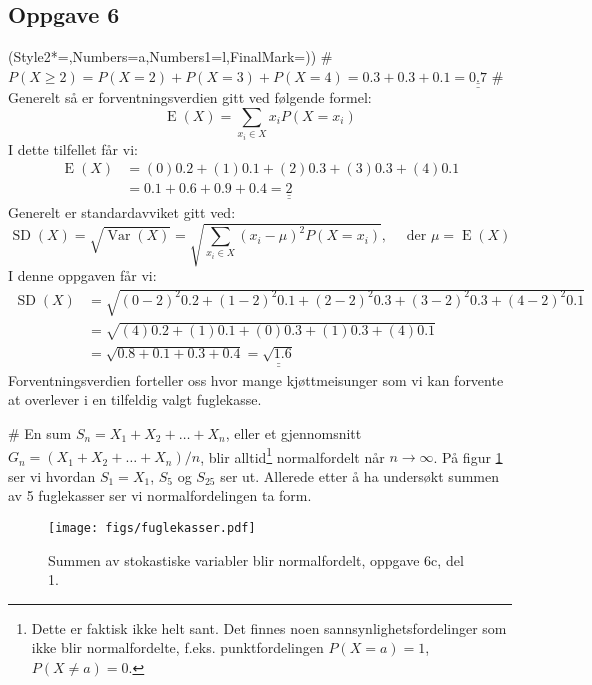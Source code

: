 \documentclass[12pt, a4paper]
{article}						%
\def\answer#1{\underline{\underline{#1}}}
\begin{document}
\subsection*{Oppgave 6}
\begin{easylist}[enumerate]
	\ListProperties(Style2*=,Numbers=a,Numbers1=l,FinalMark={)})
	# $P(X \geq 2) = P(X = 2) + P(X = 3) + P(X = 4) = 0.3 + 0.3 + 0.1 = \answer{0.7}$
	# Generelt så er forventningsverdien gitt ved følgende formel:
	\begin{equation*}
		\operatorname{E}(X) = \sum_{x_i \in X} x_i P(X = x_i) 
	\end{equation*}
	I dette tilfellet får vi:
	\begin{align*}
		\operatorname{E}(X) &= (0) 0.2 + (1) 0.1 + (2) 0.3 + (3) 0.3 + (4) 0.1 \\
		&= 0.1 + 0.6 + 0.9 + 0.4 = \answer{2}
	\end{align*}
	Generelt er standardavviket gitt ved:
	\begin{equation*}
		\operatorname{SD}(X) = \sqrt{\operatorname{Var}(X)} = \sqrt{ \sum_{x_i \in X} \left( x_i - \mu\right)^2  P(X = x_i)}, \quad \text{ der } \mu = \operatorname{E}(X)
	\end{equation*}
	I denne oppgaven får vi:
	\begin{align*}
		\operatorname{SD}(X) &= \sqrt{(0-2)^2 0.2 + (1-2)^2 0.1 + (2-2)^2 0.3 + (3-2)^2 0.3 + (4-2)^2 0.1} \\
		&= \sqrt{(4) 0.2 + (1) 0.1 + (0) 0.3 + (1) 0.3 + (4) 0.1} \\
		&= \sqrt{ 0.8 +  0.1  +  0.3 +  0.4} = \answer{\sqrt{1.6}} 
	\end{align*}
	Forventningsverdien forteller oss hvor mange kjøttmeisunger som
	vi kan forvente at overlever i en tilfeldig valgt fuglekasse.
	
	# En sum $S_n = X_1 + X_2 + \dots + X_n$, eller et gjennomsnitt $G_n = \left( X_1 + X_2 + \dots + X_n \right)/n$, blir alltid\footnote{Dette er faktisk ikke helt sant. Det finnes noen sannsynlighetsfordelinger som ikke blir normalfordelte, f.eks. punktfordelingen $P(X = a) = 1$, $P(X \neq a) = 0$.} normalfordelt når $n \to \infty$. På figur \ref{fig:fuglekasser} ser vi
	hvordan $S_1 = X_1$, $S_5$ og $S_{25}$ ser ut. Allerede etter å ha undersøkt summen
	av 5 fuglekasser ser vi normalfordelingen ta form.
	\begin{figure}[th!]
		\centering
		\texttt{[image: figs/fuglekasser.pdf]}
		\caption{Summen av stokastiske variabler blir normalfordelt, oppgave 6c, del 1. }
		\label{fig:fuglekasser}
	\end{figure}
	

\end{easylist}
\end{document}
